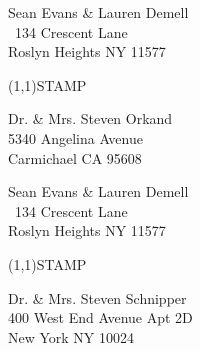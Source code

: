 \documentclass[12pt]{article}
\begin{document}
\begin{minipage}{.5\linewidth} \noindent
Sean Evans \& Lauren Demell\\\ 
134 Crescent Lane\\ 
Roslyn Heights NY 11577
\end{minipage}
\begin{minipage}{.5\linewidth \hspace{-.2in} \vspace{-.3in}}
\begin{flushright}
\framebox(1,1){STAMP}
\end{flushright}
\end{minipage}

\begin{center} \begin{Huge} \vspace*{\fill}
Dr. \& Mrs. Steven Orkand\\
5340 Angelina Avenue\\
Carmichael CA 95608\\
\vspace{\fill} \end{Huge} \end{center}

\clearpage

\begin{minipage}{.5\linewidth} \noindent
Sean Evans \& Lauren Demell\\\ 
134 Crescent Lane\\ 
Roslyn Heights NY 11577
\end{minipage}
\begin{minipage}{.5\linewidth \hspace{-.2in} \vspace{-.3in}}
\begin{flushright}
\framebox(1,1){STAMP}
\end{flushright}
\end{minipage}

\begin{center} \begin{Huge} \vspace*{\fill}
Dr. \& Mrs. Steven Schnipper \\
400 West End Avenue Apt 2D\\
New York NY 10024\\
\vspace{\fill} \end{Huge} \end{center}

\clearpage
\end{document}
